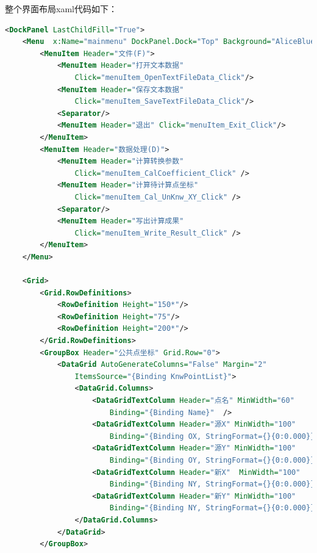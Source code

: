 整个界面布局xaml代码如下：
\begin{lstlisting}[language=xml]
<DockPanel LastChildFill="True">
    <Menu  x:Name="mainmenu" DockPanel.Dock="Top" Background="AliceBlue">
        <MenuItem Header="文件(F)">
            <MenuItem Header="打开文本数据"
                Click="menuItem_OpenTextFileData_Click"/>
            <MenuItem Header="保存文本数据"
                Click="menuItem_SaveTextFileData_Click"/>
            <Separator/>
            <MenuItem Header="退出" Click="menuItem_Exit_Click"/>
        </MenuItem>
        <MenuItem Header="数据处理(D)">
            <MenuItem Header="计算转换参数" 
                Click="menuItem_CalCoefficient_Click" />
            <MenuItem Header="计算待计算点坐标" 
                Click="menuItem_Cal_UnKnw_XY_Click" />
            <Separator/>
            <MenuItem Header="写出计算成果" 
                Click="menuItem_Write_Result_Click" />
        </MenuItem>
    </Menu>

    <Grid>
        <Grid.RowDefinitions>
            <RowDefinition Height="150*"/>
            <RowDefinition Height="75"/>
            <RowDefinition Height="200*"/>
        </Grid.RowDefinitions>
        <GroupBox Header="公共点坐标" Grid.Row="0">
            <DataGrid AutoGenerateColumns="False" Margin="2" 
                ItemsSource="{Binding KnwPointList}">
                <DataGrid.Columns>
                    <DataGridTextColumn Header="点名" MinWidth="60"
                        Binding="{Binding Name}"  />
                    <DataGridTextColumn Header="源X" MinWidth="100"
                        Binding="{Binding OX, StringFormat={}{0:0.000}}"/>
                    <DataGridTextColumn Header="源Y" MinWidth="100"
                        Binding="{Binding OY, StringFormat={}{0:0.000}}"/>
                    <DataGridTextColumn Header="新X"  MinWidth="100"
                        Binding="{Binding NY, StringFormat={}{0:0.000}}"/>
                    <DataGridTextColumn Header="新Y" MinWidth="100"
                        Binding="{Binding NY, StringFormat={}{0:0.000}}"/>
                </DataGrid.Columns>
            </DataGrid>
        </GroupBox>


\end{lstlisting}
